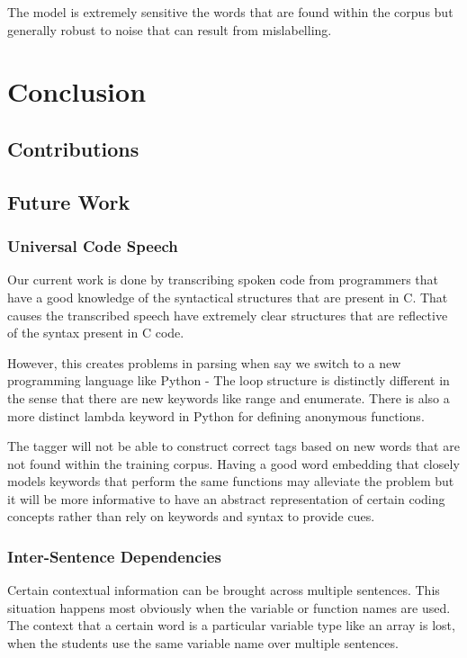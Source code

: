 \documentclass[fyp]{socreport}
\begin{document}
The model is extremely sensitive the words that are found within the corpus but
generally robust to noise that can result from mislabelling.




\chapter{Conclusion}

\section{Contributions}


\section{Future Work}

\subsection{Universal Code Speech}
Our current work is done by transcribing spoken code from programmers that have
a good knowledge of the syntactical structures that are present in C. That
causes the transcribed speech have extremely clear structures that are
reflective of the syntax present in C code.

However, this creates problems in parsing when say we switch to a new
programming language like Python - The loop structure is distinctly different
in the sense that there are new keywords like range and enumerate. There is
also a more distinct lambda keyword in Python for defining anonymous functions.

The tagger will not be able to construct correct tags based on new words that
are not found within the training corpus. Having a good word embedding that
closely models keywords that perform the same functions may alleviate the problem
but it will be more informative to have an abstract representation of certain
coding concepts rather than rely on keywords and syntax to provide cues.


\subsection{Inter-Sentence Dependencies}
Certain contextual information can be brought across multiple sentences. This
situation happens most obviously when the variable or function names are used.
The context that a certain word is a particular variable type like an array is
lost, when the students use the same variable name over multiple sentences.
\end{document}
